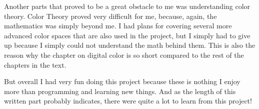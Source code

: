 Another parts that proved to be a great obstacle to me was
understanding color theory. Color Theory proved very difficult for me,
because, again, the mathematics was simply beyond me. I had plans for
covering several more advanced color spaces that are also used in the
project, but I simply had to give up because I simply could not
understand the math behind them. This is also the reason why the
chapter on digital color is so short compared to the rest of the
chapters in the text.

But overall I had very fun doing this project because these is nothing
I enjoy more than programming and learning new things. And as the
length of this written part probably indicates, there were quite a lot
to learn from this project!
